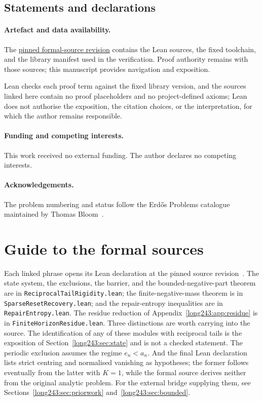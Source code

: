 \subsection*{Statements and declarations}

\paragraph{Artefact and data availability.} The
\href{\sourceurl}{pinned formal-source revision} contains the Lean sources, the
fixed toolchain, and the library manifest used in the verification.  Proof
authority remains with those sources; this manuscript provides navigation and
exposition.

Lean checks each proof term against the fixed library
version, and the sources linked here contain no proof placeholders and no
project-defined axioms; Lean does not authorise the exposition, the citation
choices, or the interpretation, for which the author remains responsible.

\paragraph{Funding and competing interests.} This work received no external
funding.  The author declares no competing interests.

\paragraph{Acknowledgements.} The problem numbering and status follow the
Erd\H{o}s Problems catalogue maintained by Thomas Bloom~\cite{erdosproblems}.

\appendix
\section{Guide to the formal sources}\label{long243:app:index}

Each linked phrase opens its Lean declaration at the pinned source
revision~\commitshort.  The state system, the exclusions, the barrier, and the
bounded-negative-part theorem are in \texttt{ReciprocalTailRigidity.lean}; the
finite-negative-mass theorem is in \texttt{SparseResetRecovery.lean}; and the
repair-entropy inequalities are in \texttt{RepairEntropy.lean}.  The residue
reduction of Appendix~\ref{long243:app:residue} is in
\texttt{FiniteHorizonResidue.lean}.  Three distinctions are worth carrying into
the source.  The
identification of any of these modules with reciprocal tails is the exposition
of Section~\ref{long243:sec:state} and is not a checked statement.  The periodic exclusion
assumes the regime $e_n<a_n$.  And the final Lean declaration lists strict
centring and normalised vanishing as hypotheses; the former follows eventually
from the latter with $K=1$, while the formal source derives neither from the
original analytic problem.  For the external bridge supplying them,
see Sections~\ref{long243:sec:priorwork} and~\ref{long243:sec:bounded}.

